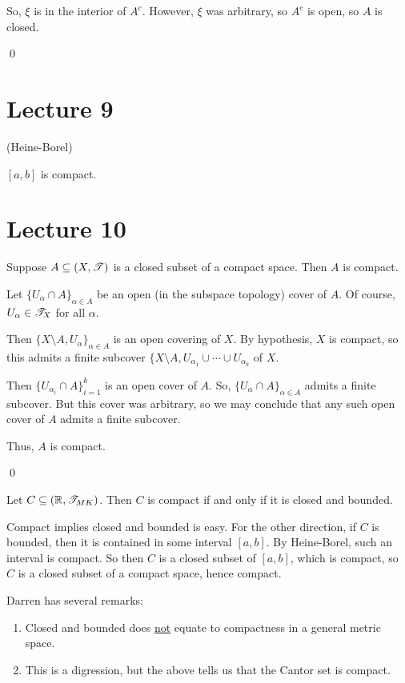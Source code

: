 \documentclass[x11names,reqno,14pt]{extarticle}
\begin{document}
So, $\xi$ is in the interior of $A^c$. However, $\xi$ was arbitrary, so $A^c$ is open, so $A$ is closed. 

\qed

\section*{Lecture 9}

\thm (Heine-Borel)

$[a, b]$ is compact.

\section*{Lecture 10}

\thm 

Suppose $A \subseteq (X, \mathscr{T})$ is a closed subset of a compact space. Then $A$ is compact. 

\proof

Let $\{U_\alpha \cap A\}_{\alpha \in A}$ be an open (in the subspace topology) cover of $A$. Of course, $U_\alpha \in \mathscr{T}_X$ for all $\alpha$. 

Then $\{X \setminus A, U_\alpha\}_{\alpha \in A}$ is an open covering of $X$. By hypothesis, $X$ is compact, so this admits a finite subcover $\{X\setminus A, U_{\alpha_1} \cup \cdots \cup U_{\alpha_k}$ of $X$. 

Then $\{U_{\alpha_i} \cap A\}_{i=1}^k$ is an open cover of $A$. So, $\{U_\alpha \cap A\}_{\alpha \in A}$ admits a finite subcover. But this cover was arbitrary, so we may conclude that any such open cover of $A$ admits a finite subcover. 

Thus, $A$ is compact. 

\qed

\cor

Let $C \subseteq (\mathbb{R}, \mathscr{T}_{MK})$. Then $C$ is compact if and only if it is closed and bounded. 

\proof

Compact implies closed and bounded is easy. For the other direction, if $C$ is bounded, then it is contained in some interval $[a, b]$. By Heine-Borel, such an interval is compact. So then $C$ is a closed subset of $[a, b]$, which is compact, so $C$ is a closed subset of a compact space, hence compact. 

\rem

Darren has several remarks:

\begin{enumerate}
\item Closed and bounded does \underline{not} equate to compactness in a general metric space. 
\item This is a digression, but the above tells us that the Cantor set is compact.
\end{enumerate}
\end{document}
